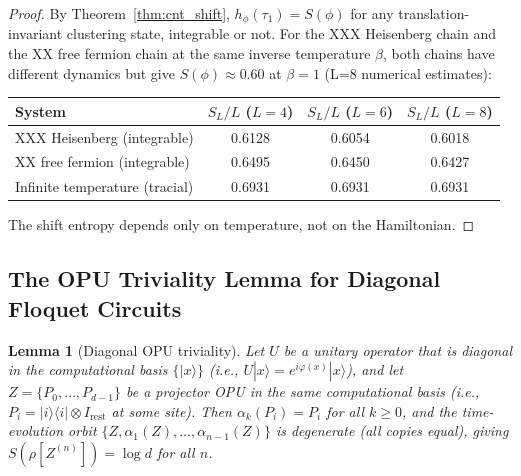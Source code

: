 \documentclass[12pt,a4paper]{article}
\newtheorem{lemma}[theorem]{Lemma}
\begin{document}
\begin{proof}
By Theorem~\ref{thm:cnt_shift}, $h_\phi(\tau_1)=S(\phi)$ for any translation-invariant
clustering state, integrable or not.  For the XXX Heisenberg chain and the XX free fermion
chain at the same inverse temperature $\beta$, both chains have different dynamics but
give $S(\phi)\approx 0.60$ at $\beta=1$ (L=8 numerical estimates):
\begin{center}
\begin{tabular}{@{}lccc@{}}
\toprule
System & $S_L/L$ ($L=4$) & $S_L/L$ ($L=6$) & $S_L/L$ ($L=8$) \\
\midrule
XXX Heisenberg (integrable) & 0.6128 & 0.6054 & 0.6018 \\
XX free fermion (integrable) & 0.6495 & 0.6450 & 0.6427 \\
Infinite temperature (tracial) & 0.6931 & 0.6931 & 0.6931 \\
\bottomrule
\end{tabular}
\end{center}
The shift entropy depends only on temperature, not on the Hamiltonian.
\end{proof}

\subsection{The OPU Triviality Lemma for Diagonal Floquet Circuits}

\begin{lemma}[Diagonal OPU triviality]\label{lem:diagonal_trivial}
Let $U$ be a unitary operator that is \emph{diagonal} in the computational basis
$\{|x\rangle\}$ (i.e., $U|x\rangle=e^{i\varphi(x)}|x\rangle$), and let
$Z=\{P_0,\ldots,P_{d-1}\}$ be a projector OPU in the same computational basis
(i.e., $P_i=|i\rangle\langle i|\otimes I_\mathrm{rest}$ at some site).
Then $\alpha_k(P_i) = P_i$ for all $k\ge 0$, and the time-evolution orbit
$\{Z, \alpha_1(Z), \ldots, \alpha_{n-1}(Z)\}$ is degenerate (all copies equal),
giving $S(\rho[Z^{(n)}]) = \log d$ for all $n$.
\end{lemma}
\end{document}
